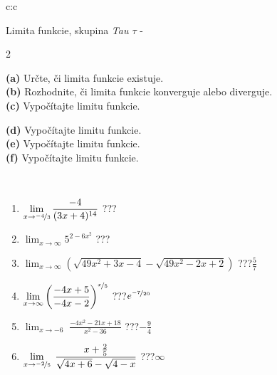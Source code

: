 \documentclass[10pt]{report}
\begin{document}
\newpage
\thispagestyle{empty}
\begin{tabular}{c:c}
\begin{minipage}[c][104.5mm][t]{0.5\linewidth}
\begin{center}
\vspace{7mm}
{\huge Limita funkcie, skupina \textit{Tau $\tau$} -}\\[5mm]
\begin{minipage}{0.95\linewidth}
\begin{center}
{\small \begin{multicols}{2} \raggedright
\textbf{(a)} Určte, či limita funkcie existuje. \\[1mm]
\textbf{(b)} Rozhodnite, či limita funkcie konverguje alebo diverguje. \\[1mm]
\textbf{(c)} Vypočítajte limitu funkcie. \par \columnbreak
\textbf{(d)} Vypočítajte limitu funkcie. \\[1mm]
\textbf{(e)} Vypočítajte limitu funkcie. \\[1mm]
\textbf{(f)} Vypočítajte limitu funkcie. \\[1mm]
\end{multicols}
}
\end{center}
\end{minipage}
\\[4mm]
\begin{minipage}{0.79\linewidth}
\begin{center}
\begin{varwidth}{\linewidth}
\begin{enumerate}
\normalsize
\item $\displaystyle\lim_{x\to\nicefrac{-4}{3}}{\frac{-4}{(3x+4)^{14}}}$\quad \dotfill\; ???\;\dotfill \quad {}
\item $\displaystyle\lim_{x\to\infty}{5^{2-6x^2}}$\quad \dotfill\; ???\;\dotfill \quad {}
\item $\displaystyle\lim_{x\to\infty}{\left(\sqrt{49x^2+3x-4} - \sqrt{49x^2-2x+2}\right)}$\quad \dotfill\; ???\;\dotfill \quad $\frac{5}{7}$
\item $\displaystyle\lim_{x\to\infty}{\left( \frac{-4x+5}{-4x-2} \right)^{\nicefrac{x}{5}}}$\quad \dotfill\; ???\;\dotfill \quad $e^{\nicefrac{-7}{20}}$
\item $\displaystyle\lim_{x\to -6}{\;\frac{-4x^2-21x+18}{x^2-36}}$\quad \dotfill\; ???\;\dotfill \quad $-\frac{9}{4}$
\item $\displaystyle\lim_{x\to \nicefrac{-2}{5}}{\;\frac{x+\frac{2}{5}}{\sqrt{4x+6} - \sqrt{4-x}}}$\quad \dotfill\; ???\;\dotfill \quad $\infty$

\end{enumerate}
\end{varwidth}
\end{center}
\end{minipage}
\end{center}
\end{minipage}
\end{tabular}
\end{document}
